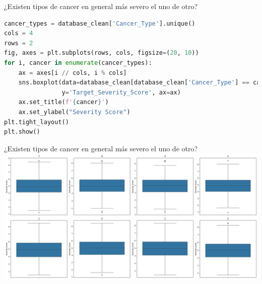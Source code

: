\documentclass{beamer}
\begin{document}
    \begin{frame}[fragile]{¿Existen tipos de cancer en general más severo el uno de otro?}

    \scriptsize
    \begin{lstlisting}[language=Python]
cancer_types = database_clean['Cancer_Type'].unique()
cols = 4
rows = 2
fig, axes = plt.subplots(rows, cols, figsize=(20, 10))
for i, cancer in enumerate(cancer_types):
    ax = axes[i // cols, i % cols]
    sns.boxplot(data=database_clean[database_clean['Cancer_Type'] == cancer],
                y='Target_Severity_Score', ax=ax)
    ax.set_title(f'{cancer}')
    ax.set_ylabel("Severity Score")
plt.tight_layout()
plt.show()
    \end{lstlisting}
    \end{frame}
    \begin{frame}[fragile]{¿Existen tipos de cancer en general más severo el uno de otro?}
    \center
    \hspace*{-1cm}
    \includegraphics[width=1.16\textwidth,keepaspectratio]{../figures/img4.png}
    \end{frame}
\end{document}
